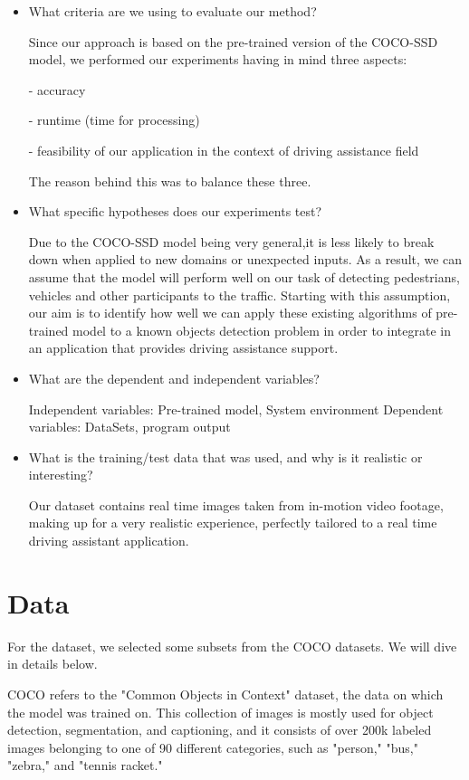 \documentclass[runningheads,a4paper,11pt]{report}
\begin{document}
\begin{itemize}
	\item What criteria are we using to evaluate our method? 
	
	Since our approach is based on the pre-trained version of the COCO-SSD model, we performed our experiments having in mind three aspects: 
	
    - accuracy
    
    - runtime (time for processing)
    
    - feasibility of our application in the context of driving assistance field
    
    The reason behind this was to balance these three.
	\item What specific hypotheses does our experiments test? 
	
	Due to the COCO-SSD model being very general,it is less likely to break down when applied to new domains or unexpected inputs. As a result, we can assume that the model will perform well on our task of detecting pedestrians, vehicles and other participants to the traffic. Starting with this assumption, our aim is to identify how well we can apply these existing algorithms of pre-trained model to a known objects detection problem in order to integrate in an application that provides driving assistance support.
	\item What are the dependent and independent variables? 
	
	Independent variables: Pre-trained model, System environment
	Dependent variables: DataSets, program output
	
	\item What is the training/test data that was used, and why is it realistic or interesting? 
	
	Our dataset contains real time images taken from in-motion video footage, making up for a very realistic experience, perfectly tailored to a real time driving assistant application.
	
\end{itemize}

\section{Data}
\label{section:data}

For the dataset, we selected some subsets from the COCO datasets. We will dive in details below.

COCO refers to the "Common Objects in Context" dataset, the data on which the model was trained on. This collection of images is mostly used for object detection, segmentation, and captioning, and it consists of over 200k labeled images belonging to one of 90 different categories, such as "person," "bus," "zebra," and "tennis racket."
\end{document}
